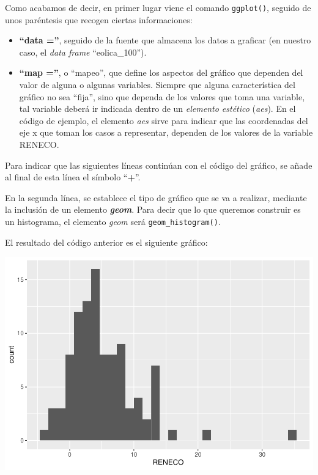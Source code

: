 \documentclass[
]{book}
\let\Oldincludegraphics\includegraphics
\renewcommand{\includegraphics}[2][]{%
  \Oldincludegraphics[#1]{#2}%
}
\begin{document}
Como acabamos de decir, en primer lugar viene el comando \texttt{ggplot()}, seguido de unos paréntesis que recogen ciertas informaciones:

\begin{itemize}
\item
  \textbf{``data =''}, seguido de la fuente que almacena los datos a graficar (en nuestro caso, el \emph{data frame} ``eolica\_100'').
\item
  \textbf{``map =''}, o ``mapeo'', que define los aspectos del gráfico que dependen del valor de alguna o algunas variables. Siempre que alguna característica del gráfico no sea ``fija'', sino que dependa de los valores que toma una variable, tal variable deberá ir indicada dentro de un \emph{elemento estético} (\emph{aes}). En el código de ejemplo, el elemento \emph{aes} sirve para indicar que las coordenadas del eje x que toman los casos a representar, dependen de los valores de la variable RENECO.
\end{itemize}

Para indicar que las siguientes líneas continúan con el código del gráfico, se añade al final de esta línea el símbolo ``\textbf{+}''.

En la segunda línea, se establece el tipo de gráfico que se va a realizar, mediante la inclusión de un elemento \textbf{\emph{geom}}. Para decir que lo que queremos construir es un histograma, el elemento \emph{geom} será \texttt{geom\_histogram()}.

El resultado del código anterior es el siguiente gráfico:

\includegraphics{_main_files/figure-latex/unnamed-chunk-107-1.pdf}
\end{document}
